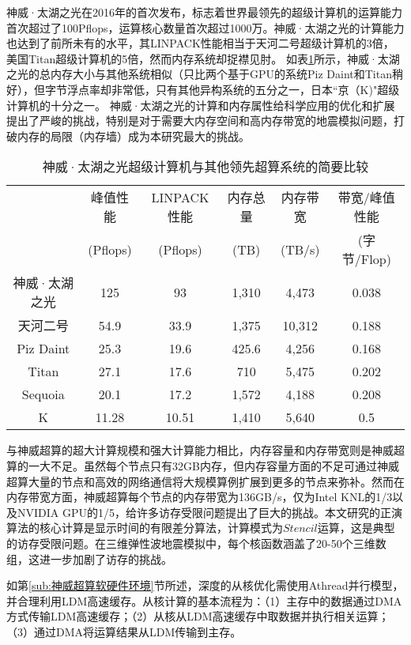 神威·太湖之光在2016年的首次发布\citep{fu2016sunway}，标志着世界最领先的超级计算机的运算能力首次超过了100Pflops，运算核心数量首次超过1000万。神威·太湖之光的计算能力也达到了前所未有的水平，其LINPACK性能相当于天河二号超级计算机的3倍，美国Titan超级计算机的5倍，然而内存系统却捉襟见肘。 如表\ref{tb:supercomputer-comp}所示，神威·太湖之光的总内存大小与其他系统相似（只比两个基于GPU的系统Piz Daint和Titan稍好），但字节浮点率却非常低，只有其他异构系统的五分之一，日本“京（K)"超级计算机的十分之一。 神威·太湖之光的计算和内存属性给科学应用的优化和扩展提出了严峻的挑战，特别是对于需要大内存空间和高内存带宽的地震模拟问题，打破内存的局限（内存墙）成为本研究最大的挑战。

\begin{table}[ht]
\footnotesize
\caption{神威·太湖之光超级计算机与其他领先超算系统的简要比较}
\label{tb:supercomputer-comp}
\center
\begin{tabular}{cccccc}
\hline
   & 峰值性能 & LINPACK性能 & 内存总量  &内存带宽 & 带宽/峰值性能 \\
   & (Pflops) & (Pflops) & (TB) & (TB/s) & (字节/Flop) \\
   \hline
   神威·太湖之光 & 125 & 93 & 1,310 & 4,473 & 0.038 \\
   天河二号 & 54.9 & 33.9 & 1,375 & 10,312 & 0.188 \\
   Piz Daint & 25.3 & 19.6 & 425.6 & 4,256 & 0.168 \\
   Titan & 27.1 & 17.6 & 710 & 5,475 & 0.202 \\
   Sequoia & 20.1 & 17.2 & 1,572 & 4,188 & 0.208 \\
   K & 11.28 & 10.51 & 1,410 & 5,640 & 0.5 \\
\hline
\end{tabular}
\end{table}

与神威超算的超大计算规模和强大计算能力相比，内存容量和内存带宽则是神威超算的一大不足。虽然每个节点只有32GB内存，但内存容量方面的不足可通过神威超算大量的节点和高效的网络通信将大规模算例扩展到更多的节点来弥补。然而在内存带宽方面，神威超算每个节点的内存带宽为136GB/s，仅为Intel KNL的1/3以及NVIDIA GPU的1/5，给许多访存受限问题提出了巨大的挑战。本文研究的正演算法的核心计算是显示时间的有限差分算法，计算模式为$Stencil$运算，这是典型的访存受限问题。在三维弹性波地震模拟中，每个核函数涵盖了20-50个三维数组，这进一步加剧了访存的挑战。

如第\ref{sub:神威超算软硬件环境}节所述，深度的从核优化需使用Athread并行模型，并合理利用LDM高速缓存。从核计算的基本流程为：（1）主存中的数据通过DMA方式传输LDM高速缓存；（2）从核从LDM高速缓存中取数据并执行相关运算；（3）通过DMA将运算结果从LDM传输到主存。

